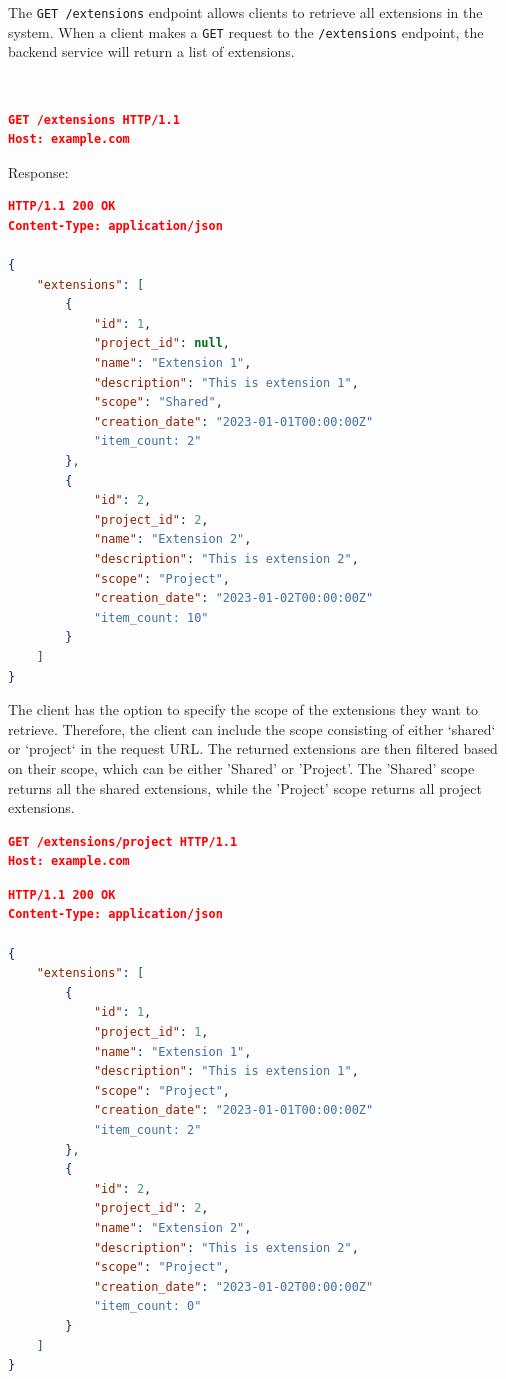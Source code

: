
The \texttt{GET /extensions} endpoint allows clients to retrieve all extensions in the system.
When a client makes a \texttt{GET} request to the \texttt{/extensions} endpoint, the backend service will return a list of extensions.

\\

\begin{lstlisting}[language=json,label={lst:lstlisting13}]
GET /extensions HTTP/1.1
Host: example.com
\end{lstlisting}

Response:

\begin{lstlisting}[language=json,label={lst:lstlisting23}]
HTTP/1.1 200 OK
Content-Type: application/json

{
    "extensions": [
        {
            "id": 1,
            "project_id": null,
            "name": "Extension 1",
            "description": "This is extension 1",
            "scope": "Shared",
            "creation_date": "2023-01-01T00:00:00Z"
            "item_count: 2"
        },
        {
            "id": 2,
            "project_id": 2,
            "name": "Extension 2",
            "description": "This is extension 2",
            "scope": "Project",
            "creation_date": "2023-01-02T00:00:00Z"
            "item_count: 10"
        }
    ]
}
\end{lstlisting}


The client has the option to specify the scope of the extensions they want to retrieve.
Therefore, the client can include the scope consisting of either `shared` or `project` in the request URL\@.
The returned extensions are then filtered based on their scope, which can be either 'Shared' or 'Project'.
The 'Shared' scope returns all the shared extensions, while the 'Project' scope returns all project extensions.

\begin{lstlisting}[language=json,label={lst:lstlisting22}]
GET /extensions/project HTTP/1.1
Host: example.com
\end{lstlisting}

\begin{lstlisting}[language=json,label={lst:lstlisting14}]
HTTP/1.1 200 OK
Content-Type: application/json

{
    "extensions": [
        {
            "id": 1,
            "project_id": 1,
            "name": "Extension 1",
            "description": "This is extension 1",
            "scope": "Project",
            "creation_date": "2023-01-01T00:00:00Z"
            "item_count: 2"
        },
        {
            "id": 2,
            "project_id": 2,
            "name": "Extension 2",
            "description": "This is extension 2",
            "scope": "Project",
            "creation_date": "2023-01-02T00:00:00Z"
            "item_count: 0"
        }
    ]
}
\end{lstlisting}


